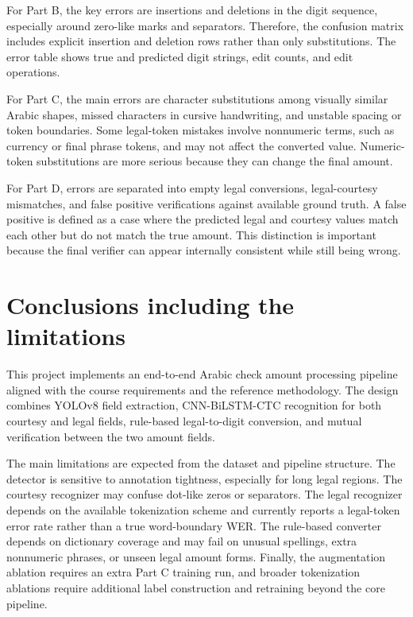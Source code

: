 \documentclass{article}
\begin{document}
For Part B, the key errors are insertions and deletions in the digit sequence, especially around zero-like marks and separators. Therefore, the confusion matrix includes explicit insertion and deletion rows rather than only substitutions. The error table shows true and predicted digit strings, edit counts, and edit operations.

For Part C, the main errors are character substitutions among visually similar Arabic shapes, missed characters in cursive handwriting, and unstable spacing or token boundaries. Some legal-token mistakes involve nonnumeric terms, such as currency or final phrase tokens, and may not affect the converted value. Numeric-token substitutions are more serious because they can change the final amount.

For Part D, errors are separated into empty legal conversions, legal-courtesy mismatches, and false positive verifications against available ground truth. A false positive is defined as a case where the predicted legal and courtesy values match each other but do not match the true amount. This distinction is important because the final verifier can appear internally consistent while still being wrong.

\section{Conclusions including the limitations}

This project implements an end-to-end Arabic check amount processing pipeline aligned with the course requirements and the reference methodology. The design combines YOLOv8 field extraction, CNN-BiLSTM-CTC recognition for both courtesy and legal fields, rule-based legal-to-digit conversion, and mutual verification between the two amount fields.

The main limitations are expected from the dataset and pipeline structure. The detector is sensitive to annotation tightness, especially for long legal regions. The courtesy recognizer may confuse dot-like zeros or separators. The legal recognizer depends on the available tokenization scheme and currently reports a legal-token error rate rather than a true word-boundary WER. The rule-based converter depends on dictionary coverage and may fail on unusual spellings, extra nonnumeric phrases, or unseen legal amount forms. Finally, the augmentation ablation requires an extra Part C training run, and broader tokenization ablations require additional label construction and retraining beyond the core pipeline.
\end{document}
